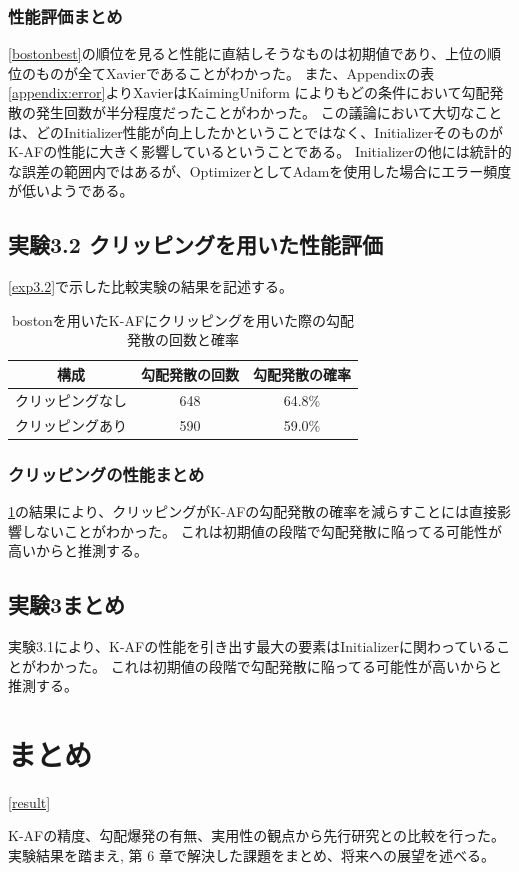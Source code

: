 \subsubsection{性能評価まとめ}
\ref{bostonbest}の順位を見ると性能に直結しそうなものは初期値であり、上位の順位のものが全てXavierであることがわかった。
また、Appendixの表\ref{appendix:error}よりXavierはKaimingUniform によりもどの条件において勾配発散の発生回数が半分程度だったことがわかった。
この議論において大切なことは、どのInitializer性能が向上したかということではなく、InitializerそのものがK-AFの性能に大きく影響しているということである。
Initializerの他には統計的な誤差の範囲内ではあるが、OptimizerとしてAdamを使用した場合にエラー頻度が低いようである。

\subsection{実験3.2 クリッピングを用いた性能評価}
\label{evo3.2}
\ref{exp3.2}で示した比較実験の結果を記述する。


\begin{table}[htbp]
    \begin{center}
        \caption{bostonを用いたK-AFにクリッピングを用いた際の勾配発散の回数と確率}
        \label{clipping_boston}
        \vspace{2mm} 
        \begin{tabular}{ |c|c|c| }
        \hline
        構成 & 勾配発散の回数 & 勾配発散の確率\\
        \hline
        クリッピングなし  & 648 & 64.8\% \\
        \hline
        クリッピングあり  & 590 & 59.0\% \\
        \hline
        \end{tabular}
    \end{center}
\end{table}



\subsubsection{クリッピングの性能まとめ}
\ref{clipping_boston}の結果により、クリッピングがK-AFの勾配発散の確率を減らすことには直接影響しないことがわかった。
これは初期値の段階で勾配発散に陥ってる可能性が高いからと推測する。



\subsection{実験3まとめ}
実験3.1により、K-AFの性能を引き出す最大の要素はInitializerに関わっていることがわかった。
これは初期値の段階で勾配発散に陥ってる可能性が高いからと推測する。



\section{まとめ}
\ref{result}

K-AFの精度、勾配爆発の有無、実用性の観点から先行研究との比較を行った。
実験結果を踏まえ, 第 6 章で解決した課題をまとめ、将来への展望を述べる。


